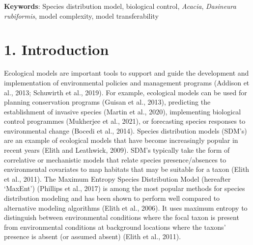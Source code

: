 \documentclass[12pt,]{article}
\begin{document}
\noindent

\textbf{Keywords}: Species distribution model, biological control,
\emph{Acacia}, \emph{Dasineura rubiformis}, model complexity, model
transferability

\setlength\parindent{24pt}

\hypertarget{introduction}{%
\section{1. Introduction}\label{introduction}}

Ecological models are important tools to support and guide the
development and implementation of environmental policies and management
programs (Addison et al., 2013; Schuwirth et al., 2019). For example,
ecological models can be used for planning conservation programs (Guisan
et al., 2013), predicting the establishment of invasive species (Martin
et al., 2020), implementing biological control programmes (Mukherjee et
al., 2021), or forecasting species responses to environmental change
(Bocedi et al., 2014). Species distribution models (SDM's) are an
example of ecological models that have become increasingly popular in
recent years (Elith and Leathwick, 2009). SDM's typically take the form
of correlative or mechanistic models that relate species
presence/absences to environmental covariates to map habitats that may
be suitable for a taxon (Elith et al., 2011). The Maximum Entropy
Species Distribution Model (hereafter `MaxEnt') (Phillips et al., 2017)
is among the most popular methods for species distribution modeling and
has been shown to perform well compared to alternative modeling
algorithms (Elith et al., 2006). It uses maximum entropy to distinguish
between environmental conditions where the focal taxon is present from
environmental conditions at background locations where the taxons'
presence is absent (or assumed absent) (Elith et al., 2011).
\end{document}
